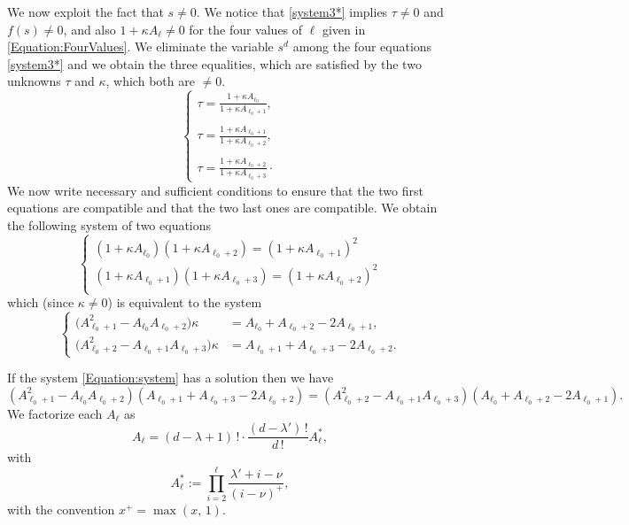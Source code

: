 \documentclass[10pt]{article}
\theoremstyle{definition}
\numberwithin{equation}{section}
\begin{document}
We now exploit the fact that $s\neq 0$.
We notice that \eqref{system3*} implies $\tau\not=0$ and $f(s)\not=0$, and also $1+\kappa A_\ell\neq 0$ for the four values of $\ell$ given in \eqref{Equation:FourValues}. 
We eliminate the variable $s^{d}$ among the four equations \eqref{system3*} and we obtain the three equalities, which are satisfied by the two unknowns 
 $\tau$ and $\kappa $, which both are $\neq 0$.
\[
\begin{cases}
\displaystyle{\tau = \frac{1+\kappa A_{\ell_0}}{1+\kappa A_{\ell_0+1}}}, \\
\\
\displaystyle{\tau = \frac{1+\kappa A_{\ell_0+1}}{1+\kappa A_{\ell_0+2}}},\\
\\
\displaystyle{\tau = \frac{1+\kappa A_{\ell_0+2}}{1+\kappa A_{\ell_0+3}}}\cdotp
\end{cases}
\]
We now write necessary and sufficient conditions to ensure that the two first equations are compatible and that the two last ones are compatible. We obtain the following system of two equations 
\[
\begin{cases}
(1+\kappa A_{\ell_0}) (1+\kappa A_{\ell_0+2}) = (1+ \kappa A_{\ell_0+1})^2\\
(1+\kappa A_{\ell_0+1}) (1+\kappa A_{\ell_0+3}) = (1+ \kappa A_{\ell_0+2})^2\\
\end{cases}
\]
which (since $\kappa\not=0$) is equivalent to the system 
\begin{equation}\label{Equation:system}
\left\{
\begin{aligned}
\bigl( A_{\ell_0+1}^2-A_{\ell_0}A_{\ell_0+2}\bigr)
\kappa 
&
= A_{\ell_0}+A_{\ell_0+2}-2A_{\ell_0+1},
\\
\bigl(A_{\ell_0+2}^2-A_{\ell_0+1}A_{\ell_0+3}\bigr)
\kappa 
&
= A_{\ell_0+1}+A_{\ell_0+3}-2A_{\ell_0+2}.
\end{aligned}
\right.
\end{equation}

If the system \eqref{Equation:system} has a solution then we have
\begin{equation}\label{Equation:569}
(A_{\ell_0+1}^2 -A_{\ell_0} A_{\ell_0+2})(A_{\ell_0 +1} +A_{\ell_0 +3} -2 A_{\ell_0 +2}) = (A_{\ell_0+2}^2 -A_{\ell_0+1} A_{\ell_0+3}) 
(A_{\ell_0 } +A_{\ell_0 +2} -2 A_{\ell_0 +1}). 
\end{equation}
 We factorize each $A_\ell$ as 
\[
A_\ell = (d-\lambda +1)\, ! \cdot \frac{(d-\lambda')\, !}{d\, !}A_\ell^*,
\]
with 
\begin{equation}\label{Equation:6.14}
A_\ell^* :=\prod_{i=2}^\ell \frac{\lambda' +i-\nu}{(i-\nu)^+},
\end{equation}
with the convention $x^+ = \max (x,\, 1)$.
\end{document}

